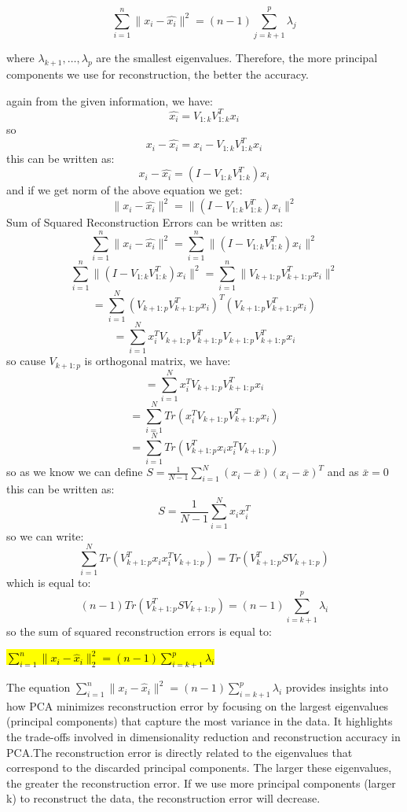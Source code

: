 \[
\sum_{i=1}^{n} \| x_i - \hat{x_i} \|^2 = (n-1) \sum_{j=k+1}^{p} \lambda_j
\]

where \( \lambda_{k+1}, \dots, \lambda_p \) are the smallest eigenvalues. Therefore, the more principal components we use for reconstruction, the better the accuracy.
\begin{qsolve}
    \begin{qsolve}[]
        again from the given information, we have:
        \[
        \hat{x_i} = V_{1:k}V_{1:k}^Tx_i
        \]
        so
        \[
        x_i - \hat{x_i} = x_i - V_{1:k}V_{1:k}^Tx_i
        \]
        this can be written as:
        \[
        x_i - \hat{x_i} = (I - V_{1:k}V_{1:k}^T)x_i
        \]
        and if we get norm of the above equation we get:
        \[
        \|x_i - \hat{x_i}\|^2 = \|(I - V_{1:k}V_{1:k}^T)x_i\|^2
        \]
        Sum of Squared Reconstruction Errors can be written as:
        \[
        \sum_{i=1}^{n}\|x_i - \hat{x_i}\|^2 = \sum_{i=1}^{n}\|(I - V_{1:k}V_{1:k}^T)x_i\|^2
        \]
        $$ \sum_{i=1}^{n}\|(I - V_{1:k}V_{1:k}^T)x_i\|^2 = \sum_{i=1}^{n}\|V_{k+1:p}V_{k+1:p}^Tx_i\|^2 $$
        $$ = \sum_{i=1}^{N}(V_{k+1:p}V_{k+1:p}^T x_i)^T(V_{k+1:p}V_{k+1:p}^T x_i) $$
        $$ = \sum_{i=1}^{N}x_i^T V_{k+1:p}V_{k+1:p}^T V_{k+1:p}V_{k+1:p}^T x_i $$
        so cause $V_{k+1:p}$ is orthogonal matrix, we have:
        $$ = \sum_{i=1}^{N}x_i^T V_{k+1:p}V_{k+1:p}^T x_i $$
        $$ = \sum_{i=1}^{N}Tr(x_i^T V_{k+1:p}V_{k+1:p}^T x_i) $$
        \splitqsolve[\splitqsolve]
		$$ = \sum_{i=1}^{N}Tr(V_{k+1:p}^T x_i x_i^T V_{k+1:p}) $$
		so as we know we can define $S = \frac{1}{N-1}\sum_{i=1}^{N}(x_i-\bar{x})(x_i-\bar{x})^T$ and as $\bar{x} = 0$ this can be written as:
        $$ S = \frac{1}{N-1}\sum_{i=1}^{N}x_i x_i^T $$
        so we can write:
        $$ \sum_{i=1}^{N}Tr(V_{k+1:p}^T x_i x_i^T V_{k+1:p}) = Tr(V_{k+1:p}^T S V_{k+1:p}) $$
        which is equal to:
        $$ (n-1)Tr(V_{k+1:p}^T S V_{k+1:p}) = (n-1)\sum_{i=k+1}^{p}\lambda_i $$
        so the sum of squared reconstruction errors is equal to:
        \begin{center}
            \hl{$ \sum_{i=1}^n \| x_i - \hat{x}_i \|_2^2 = (n - 1) \sum_{i=k+1}^p \lambda_i$}
        \end{center}
        The equation
        $
        \sum_{i=1}^{n} \|x_i - \hat{x}_i\|^2 = (n-1) \sum_{i=k+1}^{p} \lambda_i
        $
        provides insights into how PCA minimizes reconstruction error by focusing on the largest eigenvalues (principal components) that capture the most variance in the data. It highlights the trade-offs involved in dimensionality reduction and reconstruction accuracy in PCA.The reconstruction error is directly related to
        the eigenvalues that correspond to the discarded principal components. The larger these
        eigenvalues, the greater the reconstruction error. If we use more principal components (larger k) to reconstruct the data, the reconstruction error will decrease.
    \end{qsolve}
\end{qsolve}